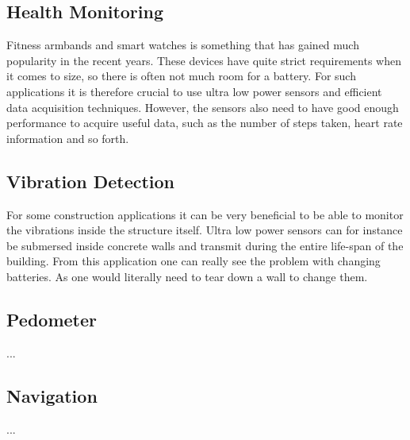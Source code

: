 \subsection{Health Monitoring}

Fitness armbands and smart watches is something that has gained much popularity in the recent years. These devices have quite strict requirements when it comes to size, so there is often not much room for a battery. For such applications it is therefore crucial to use ultra low power sensors and efficient data acquisition techniques. However, the sensors also need to have good enough performance to acquire useful data, such as the number of steps taken, heart rate information and so forth.  

\subsection{Vibration Detection}

For some construction applications it can be very beneficial to be able to monitor the vibrations inside the structure itself. Ultra low power sensors can for instance be submersed inside concrete walls and transmit during the entire life-span of the building. From this application one can really see the problem with changing batteries. As one would literally need to tear down a wall to change them. 

\subsection{Pedometer}

...

\subsection{Navigation}

...